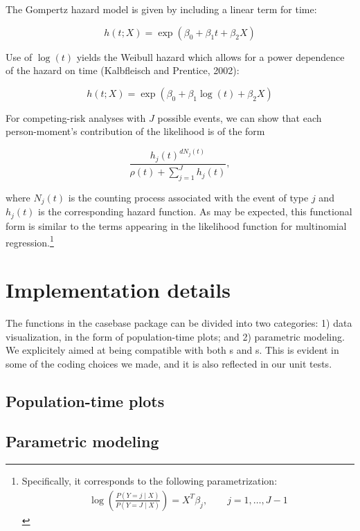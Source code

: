 \documentclass[
]{jss}
\begin{document}
The Gompertz hazard model is given by including a linear term for time:

\[ h(t;X)  = \exp(\beta_0 + \beta_1 t + \beta_2 X) \]

Use of \(\log(t)\) yields the Weibull hazard which allows for a power
dependence of the hazard on time (Kalbfleisch and Prentice, 2002):

\[ h(t;X)  = \exp(\beta_0 + \beta_1 \log(t) + \beta_2 X) \]

For competing-risk analyses with \(J\) possible events, we can show that
each person-moment's contribution of the likelihood is of the form

\[\frac{h_j(t)^{dN_j(t)}}{\rho(t) + \sum_{j=1}^Jh_j(t)},\]

where \(N_j(t)\) is the counting process associated with the event of
type \(j\) and \(h_j(t)\) is the corresponding hazard function. As may
be expected, this functional form is similar to the terms appearing in
the likelihood function for multinomial
regression.\footnote{Specifically, it corresponds to the following parametrization: \begin{align*} \log\left(\frac{P(Y=j \mid X)}{P(Y = J \mid X)}\right) = X^T\beta_j, \qquad j = 1,\ldots, J-1\end{align*}}

\hypertarget{implementation-details}{%
\section{Implementation details}\label{implementation-details}}

The functions in the casebase package can be divided into two
categories: 1) data visualization, in the form of population-time plots;
and 2) parametric modeling. We explicitely aimed at being compatible
with both s and s. This is evident in
some of the coding choices we made, and it is also reflected in our unit
tests.

\hypertarget{population-time-plots}{%
\subsection{Population-time plots}\label{population-time-plots}}

\hypertarget{parametric-modeling}{%
\subsection{Parametric modeling}\label{parametric-modeling}}
\end{document}
